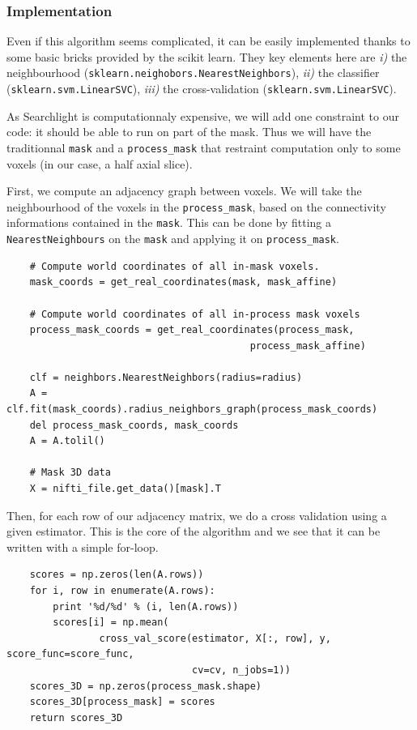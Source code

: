 \documentclass{frontiersSCNS} %
\newcommand{\alex}[1]{\todo[inline, color=green!40]{#1}}
\begin{document}
\subsubsection{Implementation}

Even if this algorithm seems complicated, it can be easily implemented thanks to
some basic bricks provided by the scikit learn. They key elements here are
\textit{i)} the neighbourhood (\verb!sklearn.neighobors.NearestNeighbors!),
\textit{ii)} the classifier (\verb!sklearn.svm.LinearSVC!),
\textit{iii)} the cross-validation (\verb!sklearn.svm.LinearSVC!).

As Searchlight is computationnaly expensive, we will add one constraint to our
code: it should be able to run on part of the mask. Thus we will have the
traditionnal \verb!mask! and a \verb!process_mask! that restraint computation
only to some voxels (in our case, a half axial slice).

First, we compute an adjacency graph between voxels. We will take the
neighbourhood of the voxels in the \verb!process_mask!, based on the
connectivity informations contained in the \verb!mask!. This can be done by
fitting a \verb!NearestNeighbours! on the \verb!mask! and applying it on
\verb!process_mask!. \alex{TODO: reformulate}

\begin{lstlisting}
    # Compute world coordinates of all in-mask voxels.
    mask_coords = get_real_coordinates(mask, mask_affine)

    # Compute world coordinates of all in-process mask voxels
    process_mask_coords = get_real_coordinates(process_mask,
                                          process_mask_affine)

    clf = neighbors.NearestNeighbors(radius=radius)
    A = clf.fit(mask_coords).radius_neighbors_graph(process_mask_coords)
    del process_mask_coords, mask_coords
    A = A.tolil()

    # Mask 3D data
    X = nifti_file.get_data()[mask].T
\end{lstlisting}

Then, for each row of our adjacency matrix, we do a cross validation using a
given estimator. This is the core of the algorithm and we see that it can be
written with a simple for-loop.

\begin{lstlisting}
    scores = np.zeros(len(A.rows))
    for i, row in enumerate(A.rows):
        print '%d/%d' % (i, len(A.rows))
        scores[i] = np.mean(
                cross_val_score(estimator, X[:, row], y, score_func=score_func,
                                cv=cv, n_jobs=1))
    scores_3D = np.zeros(process_mask.shape)
    scores_3D[process_mask] = scores
    return scores_3D
\end{lstlisting}
\end{document}
